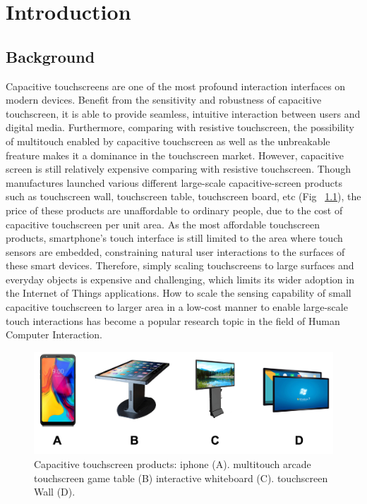 \chapter{Introduction}

\section{Background}
Capacitive touchscreens are one of the most profound interaction interfaces on modern devices. Benefit from the sensitivity and robustness of capacitive touchscreen, it is able to provide seamless, intuitive interaction between users and digital media. Furthermore, comparing with resistive touchscreen, the possibility of multitouch enabled by capacitive touchscreen as well as the unbreakable freature makes it a dominance in the touchscreen market. However, capacitive screen is still relatively expensive comparing with resistive touchscreen. Though manufactures launched various different large-scale capacitive-screen products such as touchscreen wall, touchscreen table, touchscreen board, etc (Fig ~\ref{fig:touchscreen-products}), the price of these products are unaffordable to ordinary people, due to the cost of capacitive touchscreen per unit area. As the most affordable touchscreen products, smartphone's touch interface is still limited to the area where touch sensors are embedded, constraining natural user interactions to the surfaces of these smart devices. Therefore, simply scaling touchscreens to large surfaces and everyday objects is expensive and challenging, which limits its wider adoption in the Internet of Things applications. How to scale the sensing capability of small capacitive touchscreen to larger area in a low-cost manner to enable large-scale touch interactions has become a popular research topic in the field of Human Computer Interaction.

\begin{figure}[ht]
  \centering
    \includegraphics[width=0.95\columnwidth]{figures/touchproducts.png}
    \setlength{\belowcaptionskip}{-8pt}
    \caption{Capacitive touchscreen products: iphone (A). multitouch arcade touchscreen game table (B) interactive whiteboard (C). touchscreen Wall (D).}
    \label{fig:touchscreen-products}
\end{figure}

